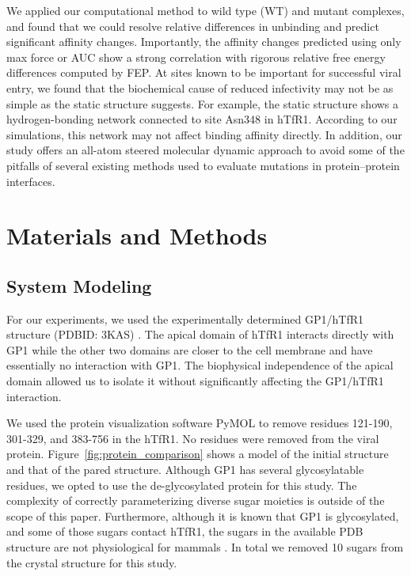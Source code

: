 \documentclass[12pt]{article}
\begin{document}
We applied our computational method to wild type (WT) and mutant complexes, and found that we could resolve relative differences in unbinding and predict significant affinity changes. Importantly, the affinity changes predicted using only max force or AUC show a strong correlation with rigorous relative free energy differences computed by FEP. At sites known to be important for successful viral entry, we found that the biochemical cause of reduced infectivity may not be as simple as the static structure suggests. For example, the static structure shows a hydrogen-bonding network connected to site Asn348 in hTfR1. According to our simulations, this network may not affect binding affinity directly. In addition, our study offers an all-atom steered molecular dynamic approach to avoid some of the pitfalls of several existing methods used to evaluate mutations in protein--protein interfaces.

\section{Materials and Methods}

\subsection{System Modeling}

For our experiments, we used the experimentally determined GP1/hTfR1 structure (PDBID: 3KAS) \citep{Abraham2010}. The apical domain of hTfR1 interacts directly with GP1 while the other two domains are closer to the cell membrane and have essentially no interaction with GP1. The biophysical independence of the apical domain allowed us to isolate it without significantly affecting the GP1/hTfR1 interaction. 

We used the protein visualization software PyMOL \citep{PyMOL} to remove residues 121-190, 301-329, and 383-756 in the hTfR1. No residues were removed from the viral protein.  Figure~\ref{fig:protein_comparison} shows a model of the initial structure and that of the pared structure. Although GP1 has several glycosylatable residues, we opted to use the de-glycosylated protein for this study. The complexity of correctly parameterizing diverse sugar moieties is outside of the scope of this paper. Furthermore, although it is known that GP1 is glycosylated, and some of those sugars contact hTfR1, the sugars in the available PDB structure are not physiological for mammals \citep{Abraham2010}.  In total we removed 10 sugars from the crystal structure for this study.
\end{document}
